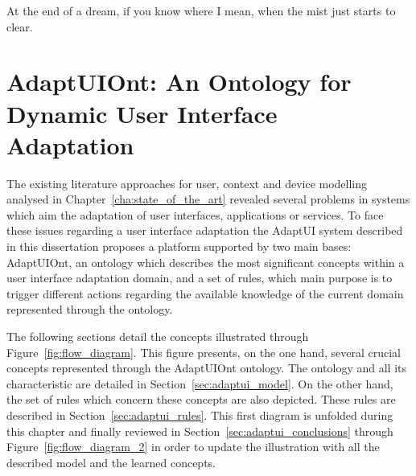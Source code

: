 
\begin{savequote}[50mm]
At the end of a dream, if you know where I mean, when the mist just starts to clear.
\end{savequote}


\chapter{AdaptUIOnt: An Ontology for Dynamic User Interface Adaptation}
\label{cha:ontology_model}

\ifpdf
    \graphicspath{{3_ontology_model/figures/PNG/}{3_ontology_model/figures/PDF/}{3_ontology_model/figures/}}
\else
    \graphicspath{{3_ontology_model/figures/EPS/}{3_ontology_model/figures/}}
\fi

The existing literature approaches for user, context and device modelling
analysed in Chapter~\ref{cha:state_of_the_art} revealed several problems in
systems which aim the adaptation of user interfaces, applications or services.
To face these issues regarding a user interface adaptation the AdaptUI system
described in this dissertation proposes a platform supported by two main bases:
AdaptUIOnt, an ontology which describes the most significant concepts within a
user interface adaptation domain, and a set of rules, which main purpose is
to trigger different actions regarding the available knowledge of the current
domain represented through the ontology.

The following sections detail the concepts illustrated through Figure~\ref{fig:flow_diagram}.
This figure presents, on the one hand, several crucial concepts represented
through the AdaptUIOnt ontology. The ontology and all its characteristic are
detailed in Section~\ref{sec:adaptui_model}. On the other hand, the set of rules
which concern these concepts are also depicted. These rules are described in
Section~\ref{sec:adaptui_rules}. This first diagram is unfolded during this
chapter and finally reviewed in Section~\ref{sec:adaptui_conclusions} through
Figure~\ref{fig:flow_diagram_2} in order to update the illustration with all the
described model and the learned concepts.


